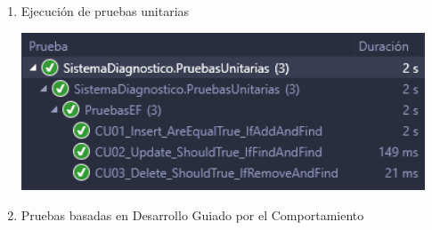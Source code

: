 \documentclass[preprint,12pt]{elsarticle}
\begin{document}
\begin{enumerate}
\item Ejecución de pruebas unitarias

\begin{center}
	\includegraphics[width=12cm]{./imagen/Screenshot_2.png}
	\end{center}
	
\item Pruebas basadas en Desarrollo Guiado por el Comportamiento
\end{enumerate}
\end{document}
